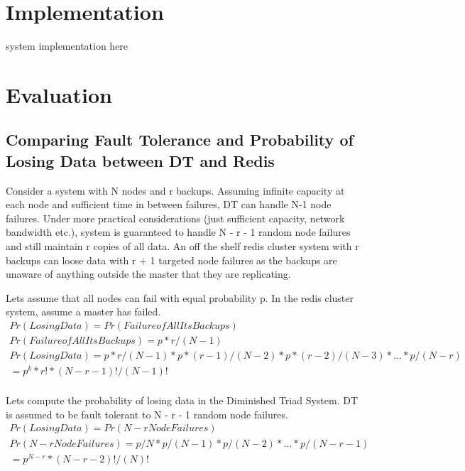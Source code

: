 \documentclass[10pt,twocolumn,letterpaper]{article}
\begin{document}
\section{Implementation} \label{implementation}
system implementation here

\section{Evaluation} \label{evaluation}

\subsection{Comparing Fault Tolerance and Probability of Losing Data between DT and Redis}
Consider a system with N nodes and r backups. Assuming infinite capacity at each node and sufficient time in between failures, DT can handle N-1 node failures. Under more practical considerations (just sufficient capacity, network bandwidth etc.), system is guaranteed to handle N - r - 1 random node failures and still maintain r copies of all data.
An off the shelf redis cluster system with r backups can loose data with r + 1 targeted node failures as the backups are unaware of anything outside the master that they are replicating.

Lets assume that all nodes can fail with equal probability p. In the redis cluster system, assume a master has failed. 
\begin{equation}\label{xx}
\begin{split}
Pr(Losing Data) = Pr(Failure of All Its Backups)\\
Pr(Failure of All Its Backups) = p* r / (N - 1)\\
Pr(Losing Data) = p*r/(N-1) * p*(r-1)/(N-2) * p*(r-2)/(N-3) * ... * p/(N-r)\\
=p^{k}*r!*(N-r-1)!/(N-1)!\\
\end{split}
\end{equation}

Lets compute the probability of losing data in the Diminished Triad System. DT is assumed to be fault tolerant to N - r - 1 random node failures.
\begin{equation}\label{xx}
\begin{split}
Pr(Losing Data) = Pr(N - r  Node Failures)\\
Pr(N - r  Node Failures) = p/N * p/(N-1) * p/(N-2) * ... * p/(N-r-1)\\
=p^{N-r}*(N-r-2)!/(N)!\\
\end{split}
\end{equation}
\end{document}
